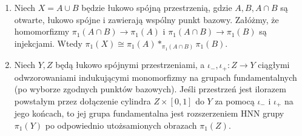 \begin{twierdzenie}
\label{thm:tg-vk-amalgam-hnn}
\begin{enumerate}[label=(\roman*)]
\item Niech $X=A\cup B$ będzie łukowo spójną
przestrzenią, gdzie $A,B,A\cap B$ są otwarte,
łukowo spójne i zawierają wspólny punkt bazowy.
Załóżmy, że homomorfizmy
$\pi_1(A\cap B)\to\pi_1(A)$ i
$\pi_1(A\cap B)\to\pi_1(B)$ są injekcjami.
Wtedy
$\pi_1(X)\cong\pi_1(A)*_{\pi_1(A\cap B)}\pi_1(B)$.
\item Niech $Y,Z$ będą łukowo spójnymi przestrzeniami,
a $\iota_-,\iota_+\colon Z\to Y$ ciągłymi odwzorowaniami
indukującymi monomorfizmy na grupach fundamentalnych
(po wyborze zgodnych punktów bazowych). Jeśli przestrzeń
jest ilorazem powstałym przez dołączenie cylindra $Z\times[0,1]$ do $Y$
za pomocą $\iota_-$ i $\iota_+$ na jego końcach,
to jej grupa fundamentalna jest
rozszerzeniem HNN grupy $\pi_1(Y)$ po odpowiednio
utożsamionych obrazach $\pi_1(Z)$.
\end{enumerate}
\end{twierdzenie}
